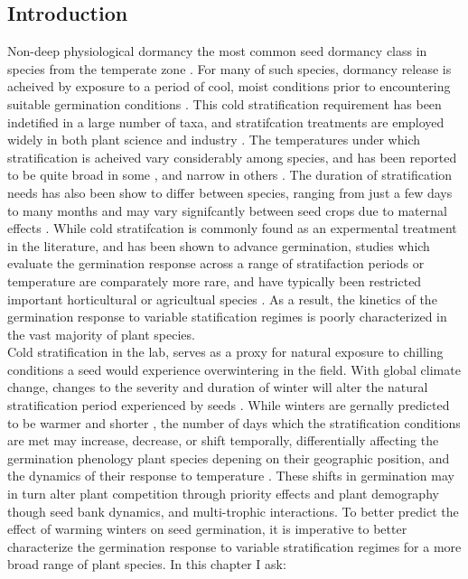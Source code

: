 \documentclass{article}\usepackage[]{graphicx}\usepackage[]{color}
\begin{document}
{{\subsection{Introduction}
Non-deep physiological dormancy the most common seed dormancy class in species from the temperate zone \citep{Finch-Savage_2006}. For many of such species, dormancy release is acheived by exposure to a period of cool, moist conditions prior to encountering suitable germination conditions \citep{}. This cold stratification requirement has been indetified in a large number of taxa, and stratifcation treatments are employed widely in both plant science and industry \citep{Hartmann_2011}. The temperatures under which stratification is acheived vary considerably among species, and has been reported to be quite broad in some \citep{Pritchard_1999,Vleeshouwers_2001}, and narrow in others \citep{WASHITAN_1988}. The duration of stratification needs has also been show to differ between species, ranging from just a few days \citpe*{} to many months \citep{} and may vary signifcantly between seed crops due to maternal effects  \citep{}. While cold stratifcation is commonly found as an expermental treatment in the literature, and has been shown to advance germination, studies which evaluate the germination response across a range of stratifaction periods or temperature are comparately more rare, and have typically been restricted important horticultural or agricultual species \citep{}. As a result, the kinetics of the germination response to variable statification regimes is poorly characterized in the vast majority of plant species.\\
\indent Cold stratification in the lab, serves as a proxy for natural exposure to chilling conditions a seed would experience overwintering in the field. With global climate change, changes to the severity and duration of winter will alter the natural stratification period experienced by seeds \citep{}. While winters are gernally predicted to be warmer and shorter \citep{IPCC}, the number of days which the stratification conditions are met may increase, decrease, or shift temporally, differentially affecting the germination phenology plant species depening on their geographic position, and the dynamics of their response to temperature \citep{Walck_2011}. These shifts in germination may in turn alter plant competition through priority effects \citep{} and plant demography though seed bank dynamics, and multi-trophic interactions.
\indent To better predict the effect of warming winters on seed germination, it is imperative to better characterize the germination response to variable stratification regimes for a more broad range of plant species. In this chapter I ask:
}}
\end{document}
